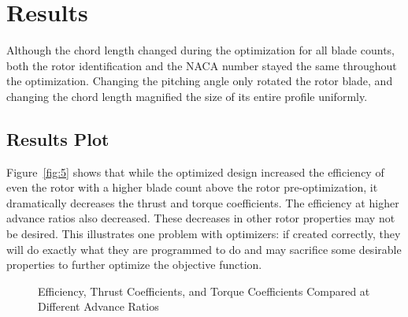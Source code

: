 \documentclass[journal ]{new-aiaa}
\begin{document}
\section{Results}

Although the chord length changed during the optimization for all blade counts, both the rotor identification and the NACA number stayed the same throughout the optimization. Changing the pitching angle only rotated the rotor blade, and changing the chord length magnified the size of its entire profile uniformly.

\subsection{Results Plot}

Figure~\eqref{fig:5} shows that while the optimized design increased the efficiency of even the rotor with a higher blade count above the rotor pre-optimization, it dramatically decreases the thrust and torque coefficients. The efficiency at higher advance ratios also decreased. These decreases in other rotor properties may not be desired. This illustrates one problem with optimizers: if created correctly, they will do exactly what they are programmed to do and may sacrifice some desirable properties to further optimize the objective function.

\begin{figure}[H]
\centering

	\hspace{1em}
	\caption{Efficiency, Thrust Coefficients, and Torque Coefficients Compared at Different Advance Ratios}
	\captionsetup{aboveskip=0pt,font=it}
	\label{fig:5}
\end{figure}
\end{document}
